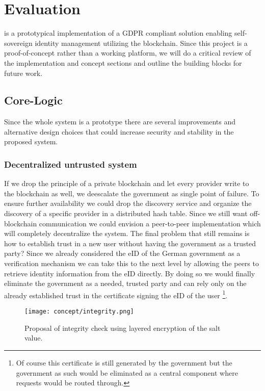 \chapter{Evaluation}
\label{cha:evaluation}

\projectName{} is a prototypical implementation of a GDPR compliant solution enabling self-sovereign identity management
utilizing the blockchain. Since this project is a proof-of-concept rather than a working platform, we will do a critical
 review of the implementation and concept sections and outline the building blocks for future work.

\section{Core-Logic}
\label{sec:coreLogicEval}
Since the whole system is a prototype there are several improvements and alternative design choices that could increase
security and stability in the proposed system.

\subsection{Decentralized untrusted system}
\label{sec:untrustedSystem}
If we drop the principle of a private blockchain and let every provider write to the blockchain as well, we deescalate
the government as single point of failure.
To ensure further availability we could drop the discovery service and organize the discovery of a specific provider
in a distributed hash table. Since we still want off-blockchain communication we could envision a peer-to-peer
implementation which will completely decentralize the system. The final problem that still remains is how to establish
trust in a new user without having the government as a trusted party? Since we already considered the eID of the German
government as a verification mechanism we can take this to the next level by allowing the peers to retrieve identity
information from the eID directly. By doing so we would finally eliminate the government as a needed, trusted party and
can rely only on the already established trust in the certificate signing the eID of the user
\footnote{Of course this certificate is still generated by the government but the government as such would be eliminated
as a central component where requests would be routed through.}.

\begin{figure}
\texttt{[image: concept/integrity.png]}
\centering
\caption{Proposal of integrity check using layered encryption of the salt value.}
\label{fig:integrity}
\end{figure}

